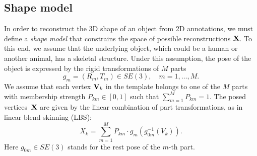 
\subsection{Shape model}\label{s:model}

In order to reconstruct the 3D shape of an object from 2D annotations, we must define a \emph{shape model} that constrains the space of possible reconstructions $\mathbf{X}$.
To this end, we assume that the underlying object, which could be a human or another animal, has a skeletal structure.
Under this assumption, the pose of the object is expressed by the rigid transformations of $M$ parts
\begin{equation}
g_m = (R_m,T_m) \in SE(3), \quad m=1,\dots,M.
\end{equation}
We assume that each vertex $\mathbf{V}_k$ in the template belongs to one of the $M$ parts with membership strength
$
P_{km} \in [0,1]
$
such that
$
\sum_{m=1}^M P_{km} = 1.
$
The posed vertices~$\mathbf{X}$ are given by the linear combination of part transformations, as in linear blend skinning (LBS):
\begin{equation}\label{e:skinning}
X_k = \sum_{m=1}^M P_{km} \cdot g_{m}(g_{0m}^{-1}(V_k)).
\end{equation}
Here $g_{0m} \in SE(3)$ stands for the rest pose of the $m$-th part.

